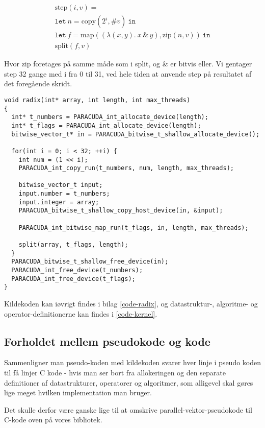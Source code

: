 \[
\begin{array}{l}
\mbox{step} (i, v) = \\
\mathtt{let\ } n = \mbox{copy} (2^i, \#v) \mathtt{\ in}\\
\mathtt{let\ } f = \mbox{map} ((\lambda (x, y).\ x\,\&\,y), \mbox{zip} (n, v)) \mathtt{\ in}\\
\mbox{split} (f, v)
\end{array}
\]

Hvor zip foretages på samme måde som i split, og $\&$ er bitvis eller.
Vi gentager step 32 gange med i fra 0 til 31,
ved hele tiden at anvende step på resultatet af det foregående skridt.

\begin{verbatim}
void radix(int* array, int length, int max_threads)
{
  int* t_numbers = PARACUDA_int_allocate_device(length);
  int* t_flags = PARACUDA_int_allocate_device(length);
  bitwise_vector_t* in = PARACUDA_bitwise_t_shallow_allocate_device();

  for(int i = 0; i < 32; ++i) {
    int num = (1 << i);
    PARACUDA_int_copy_run(t_numbers, num, length, max_threads);

    bitwise_vector_t input;
    input.number = t_numbers;
    input.integer = array;
    PARACUDA_bitwise_t_shallow_copy_host_device(in, &input);

    PARACUDA_int_bitwise_map_run(t_flags, in, length, max_threads);

    split(array, t_flags, length);
  }
  PARACUDA_bitwise_t_shallow_free_device(in);
  PARACUDA_int_free_device(t_numbers);
  PARACUDA_int_free_device(t_flags);
}
\end{verbatim}

Kildekoden kan iøvrigt findes i bilag \ref{code-radix}, 
og datastruktur-, algoritme- og operator-definitionerne
kan findes i \ref{code-kernel}.

\subsection{Forholdet mellem pseudokode og kode}

Sammenligner man pseudo-koden med kildekoden svarer hver linje
i pseudo koden til få linjer C kode - hvis man ser bort fra allokeringen og den separate definitioner
af datastrukturer, operatorer og algoritmer, som alligevel skal gøres lige meget hvilken implementation man bruger.

Det skulle derfor være ganske lige til at omskrive
parallel-vektor-pseudokode til C-kode oven på 
vores bibliotek.
